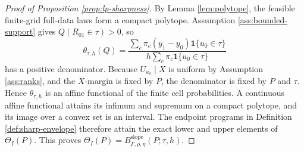 \documentclass[11pt]{article}
\newcommand{\one}{\mathbf{1}}
\theoremstyle{definition}
\theoremstyle{plain}
\theoremstyle{remark}
\begin{document}
\begin{proof}[Proof of Proposition \ref{prop:lp-sharpness}]
By Lemma \ref{lem:polytope}, the feasible finite-grid full-data laws form a compact polytope.  Assumption \ref{ass:bounded-support} gives \(Q(R_{01}\in\tau)>0\), so
\[
\theta_{\tau,h}(Q)=
\frac{
\sum_c \pi_c (y_1-y_0)\one\{u_0\in\tau\}
}{
h\sum_c\pi_c\one\{u_0\in\tau\}
}
\]
has a positive denominator.  Because \(U_{a_0}\mid X\) is uniform by Assumption \ref{ass:ranks}, and the \(X\)-margin is fixed by \(P\), the denominator is fixed by \(P\) and \(\tau\).  Hence \(\theta_{\tau,h}\) is an affine functional of the finite cell probabilities.  A continuous affine functional attains its infimum and supremum on a compact polytope, and its image over a convex set is an interval.  The endpoint programs in Definition \ref{def:sharp-envelope} therefore attain the exact lower and upper elements of \(\Theta_I(P)\).  This proves \(\Theta_I(P)=B_{\Gamma,\rho,\eta}^{\mathrm{slope}}(P;\tau,h)\).
\end{proof}
\end{document}
